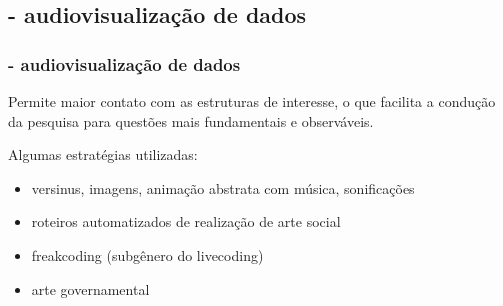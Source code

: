 \documentclass[10pt]{beamer}
\begin{document}
% 
% 

{
%

\begin{frame}
\subsection{- audiovisualização de dados}
\frametitle{- audiovisualização de dados}
\vspace{5cm}
Permite maior contato com as estruturas de interesse,
o que facilita a condução da pesquisa para questões mais
fundamentais e observáveis.

Algumas estratégias utilizadas:
\begin{itemize}
	\item versinus, imagens, animação abstrata com música, sonificações
	\item roteiros automatizados de realização de arte social
	\item freakcoding (subgênero do livecoding)
	\item arte governamental
\end{itemize}
\end{frame}
}
\end{document}
